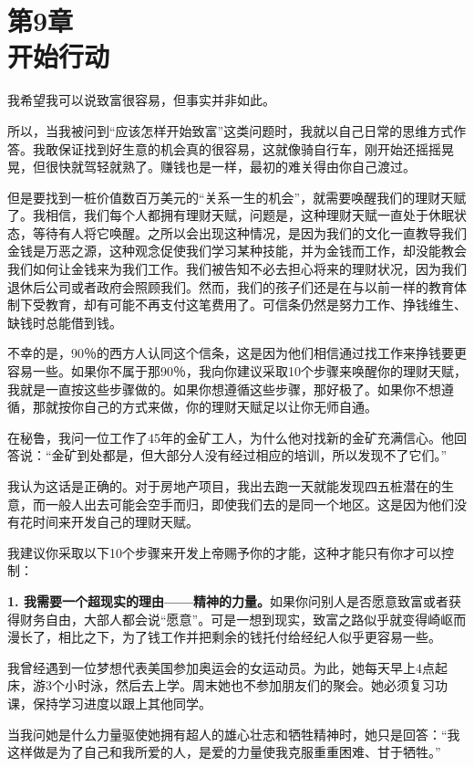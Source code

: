 \section[第9章\q 开始行动]{第9章\\开始行动}

我希望我可以说致富很容易，但事实并非如此。

所以，当我被问到“应该怎样开始致富”这类问题时，我就以自己日常的思维方式作答。我敢保证找到好生意的机会真的很容易，这就像骑自行车，刚开始还摇摇晃晃，但很快就驾轻就熟了。赚钱也是一样，最初的难关得由你自己渡过。

但是要找到一桩价值数百万美元的“关系一生的机会”，就需要唤醒我们的理财天赋了。我相信，我们每个人都拥有理财天赋，问题是，这种理财天赋一直处于休眠状态，等待有人将它唤醒。之所以会出现这种情况，是因为我们的文化一直教导我们金钱是万恶之源，这种观念促使我们学习某种技能，并为金钱而工作，却没能教会我们如何让金钱来为我们工作。我们被告知不必去担心将来的理财状况，因为我们退休后公司或者政府会照顾我们。然而，我们的孩子们还是在与以前一样的教育体制下受教育，却有可能不再支付这笔费用了。可信条仍然是努力工作、挣钱维生、缺钱时总能借到钱。

不幸的是，90％的西方人认同这个信条，这是因为他们相信通过找工作来挣钱要更容易一些。如果你不属于那90％，我向你建议采取10个步骤来唤醒你的理财天赋，我就是一直按这些步骤做的。如果你想遵循这些步骤，那好极了。如果你不想遵循，那就按你自己的方式来做，你的理财天赋足以让你无师自通。

在秘鲁，我问一位工作了45年的金矿工人，为什么他对找新的金矿充满信心。他回答说：“金矿到处都是，但大部分人没有经过相应的培训，所以发现不了它们。”

我认为这话是正确的。对于房地产项目，我出去跑一天就能发现四五桩潜在的生意，而一般人出去可能会空手而归，即使我们去的是同一个地区。这是因为他们没有花时间来开发自己的理财天赋。

我建议你采取以下10个步骤来开发上帝赐予你的才能，这种才能只有你才可以控制：

\textbf{1. 我需要一个超现实的理由——精神的力量。}如果你问别人是否愿意致富或者获得财务自由，大部人都会说“愿意”。可是一想到现实，致富之路似乎就变得崎岖而漫长了，相比之下，为了钱工作并把剩余的钱托付给经纪人似乎更容易一些。

我曾经遇到一位梦想代表美国参加奥运会的女运动员。为此，她每天早上4点起床，游3个小时泳，然后去上学。周末她也不参加朋友们的聚会。她必须复习功课，保持学习进度以跟上其他同学。

当我问她是什么力量驱使她拥有超人的雄心壮志和牺牲精神时，她只是回答：“我这样做是为了自己和我所爱的人，是爱的力量使我克服重重困难、甘于牺牲。”

